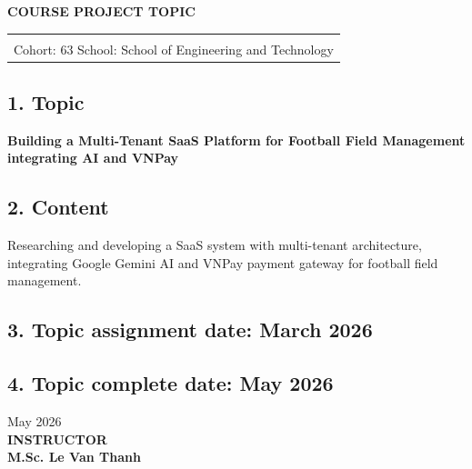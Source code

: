 \centerline{\textbf{\large COURSE PROJECT TOPIC}}

\begin{table}[htbp]
    \centering
    \begin{tabular}{l r}
    \fontsize{14pt}{0pt}\selectfont {Full name: Tran Duc Luong}    & \fontsize{14pt}{0pt}\selectfont {Student ID: 225748020110186}\\
    \multicolumn{2}{c}{Cohort: 63 \hspace{2.5cm} School: School of Engineering and Technology}
\end{tabular}
\end{table}
\subsection*{\textnormal{1. Topic}}
\textbf{Building a Multi-Tenant SaaS Platform for Football Field Management integrating AI and VNPay}

\subsection*{\textnormal{2. Content}}
Researching and developing a SaaS system with multi-tenant architecture, integrating Google Gemini AI and VNPay payment gateway for football field management.

\subsection*{\textnormal{3. Topic assignment date: March 2026}}

\subsection*{\textnormal{4. Topic complete date: May 2026}}

\hspace{11cm} \textnormal{May 2026}\\
\hspace{11.1cm} \textbf{{INSTRUCTOR}}\\
\hspace{11.1cm} \textbf{{M.Sc. Le Van Thanh}}
\newpage
